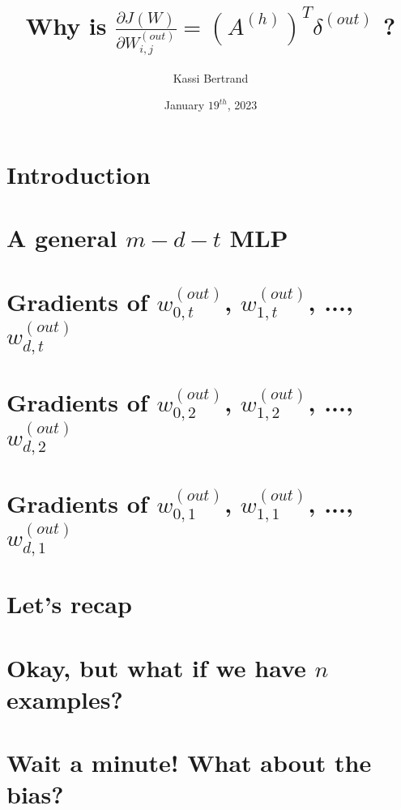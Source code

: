 \documentclass[12pt, letterpaper]{article}
\title{Why is $ \frac{\partial J(W)}{\partial W_{i,j}^{(out)}} = (A^{(h)})^{T} \delta^{(out)}$ ?}
\author{Kassi Bertrand}
\date{January $19^{th}$, 2023}
\begin{document}
\maketitle

\section{Introduction}


\pagebreak
\section{A general $m-d-t$ MLP}


\section{Gradients of $w_{0,t}^{(out)}$, $w_{1,t}^{(out)}$, ..., $w_{d,t}^{(out)}$}


\pagebreak
\section{Gradients of $w_{0,2}^{(out)}$, $w_{1,2}^{(out)}$, ..., $w_{d,2}^{(out)}$}


\pagebreak
\section{Gradients of $w_{0,1}^{(out)}$, $w_{1,1}^{(out)}$, ..., $w_{d,1}^{(out)}$}


\pagebreak
\section{Let's recap}


\pagebreak
\section{Okay, but what if we have $n$ examples?}


\pagebreak
\section{Wait a minute! What about the bias?}

\end{document}
